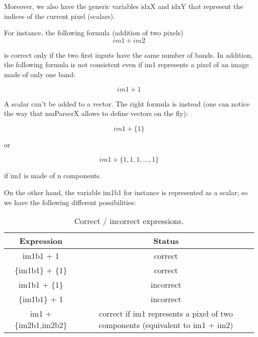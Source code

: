 Moreover, we also have the generic variables idxX and idxY that represent 
the indices of the current pixel (scalars). 


\begin{center}
\end{center}

For instance, the following formula (addition of two pixels)
\begin{equation}
  im1+im2
\end{equation}
\label{firstequation}

is correct only if the two first inputs have the same number of bands. 
In addition, the following formula is not consistent even if im1 
represents a pixel of an image made of only one band:

\begin{equation}
  im1+1
\end{equation}

A scalar can't be added to a vector. The right formula is instead 
(one can notice the way that muParserX allows to define vectors on the fly):

\begin{equation}
  im1+\{ 1 \}
\end{equation}

or

\begin{equation}
  im1 + \{1,1,1,...,1\}
\end{equation}

if im1 is made of n components. 

On the other hand, the variable im1b1 for instance is represented as a 
scalar; so we have the following different possibilities:

\begin{center}
\begin{table}
\begin{tabular}{||c|c||}
\hline
\bf Expression & \bf Status \\
\hline\hline
im1b1 + 1 & correct \\
\{im1b1\} + \{1\} & correct \\
im1b1 + \{1\} & incorrect \\
\{im1b1\} + 1 & incorrect \\
im1 + \{im2b1,im2b2\} & correct if im1 represents a pixel of two components (equivalent to  im1 + im2) \\
\hline
\end{tabular}
\caption{Correct / incorrect expressions.}
\label{correctness}
\end{table}
\end{center}


